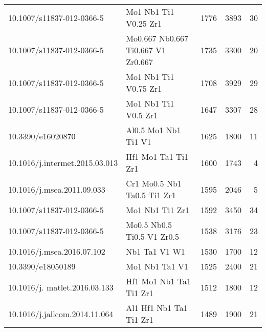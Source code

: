 \begin{tabular}{llrrr}
      10.1007/s11837-012-0366-5 &                        Mo1 Nb1 Ti1 V0.25 Zr1 &                1776 &                 3893 &                        30 \\
      10.1007/s11837-012-0366-5 &           Mo0.667 Nb0.667 Ti0.667 V1 Zr0.667 &                1735 &                 3300 &                        20 \\
      10.1007/s11837-012-0366-5 &                        Mo1 Nb1 Ti1 V0.75 Zr1 &                1708 &                 3929 &                        29 \\
      10.1007/s11837-012-0366-5 &                         Mo1 Nb1 Ti1 V0.5 Zr1 &                1647 &                 3307 &                        28 \\
              10.3390/e16020870 &                         Al0.5 Mo1 Nb1 Ti1 V1 &                1625 &                 1800 &                        11 \\
 10.1016/j.intermet.2015.03.013 &                          Hf1 Mo1 Ta1 Ti1 Zr1 &                1600 &                 1743 &                         4 \\
     10.1016/j.msea.2011.09.033 &                  Cr1 Mo0.5 Nb1 Ta0.5 Ti1 Zr1 &                1595 &                 2046 &                         5 \\
      10.1007/s11837-012-0366-5 &                              Mo1 Nb1 Ti1 Zr1 &                1592 &                 3450 &                        34 \\
      10.1007/s11837-012-0366-5 &                   Mo0.5 Nb0.5 Ti0.5 V1 Zr0.5 &                1538 &                 3176 &                        23 \\
     10.1016/j.msea.2016.07.102 &                                Nb1 Ta1 V1 W1 &                1530 &                 1700 &                        12 \\
              10.3390/e18050189 &                               Mo1 Nb1 Ta1 V1 &                1525 &                 2400 &                        21 \\
  10.1016/j. matlet.2016.03.133 &                      Hf1 Mo1 Nb1 Ta1 Ti1 Zr1 &                1512 &                 1800 &                        12 \\
  10.1016/j.jallcom.2014.11.064 &                      Al1 Hf1 Nb1 Ta1 Ti1 Zr1 &                1489 &                 1900 &                        21 \\
\bottomrule
\end{tabular}
